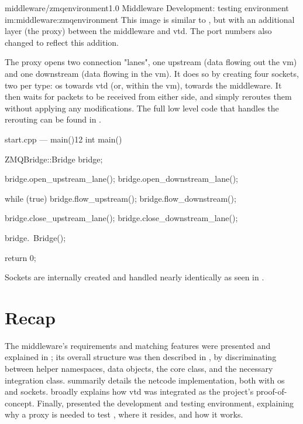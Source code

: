 \begin{image}
	{middleware/zmqenvironment}{1.0}
	{Middleware Development:  testing environment}
	{im:middleware:zmqenvironment}
	{}
	{This image is similar to , but with an additional layer (the \gls{proxy}) between the \gls{middleware} and \gls{vtd}. The port numbers also changed to reflect this addition.}
\end{image}

The \gls{proxy} opens two connection "lanes", one upstream (data flowing out the \gls{vm}) and one downstream (data flowing in the \gls{vm}). It does so by creating four sockets, two per type: \gls{os} towards \gls{vtd} (or, within the \gls{vm}),  towards the \gls{middleware}. It then waits for \glspl{packet} to be received from either side, and simply reroutes them without applying any modifications. The full low level code that handles the rerouting can be found in .

\begin{codelist}{start.cpp --- main()}{12}
int main() {
	ZMQBridge::Bridge bridge;

	bridge.open_upstream_lane();
	bridge.open_downstream_lane();

	while (true) {
		bridge.flow_upstream();
		bridge.flow_downstream();
	}

	bridge.close_upstream_lane();
	bridge.close_downstream_lane();

	bridge.~Bridge();

	return 0;
}
\end{codelist}

Sockets are internally created and handled nearly identically as seen in .

\section{Recap}\label{sc:middleware:recap}

The \gls{middleware}'s requirements and matching features were presented and explained in ; its overall structure was then described in , by discriminating between helper namespaces, data objects, the core class, and the necessary integration class.  summarily details the \gls{netcode} implementation, both with \gls{os} and  sockets.  broadly explains how \gls{vtd} was integrated as the project's proof-of-concept. Finally,  presented the development and testing environment, explaining why a \gls{proxy} is needed to test , where it resides, and how it works.
